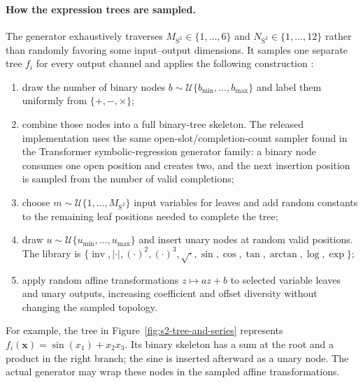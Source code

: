 \paragraph{How the expression trees are sampled.}
The generator exhaustively traverses
$M_{\mathrm{S^2}}\in\{1,\ldots,6\}$ and
$N_{\mathrm{S^2}}\in\{1,\ldots,12\}$ rather than randomly favoring some
input--output dimensions. It samples one separate tree $f_i$ for every output
channel and applies the following construction \citep{wang2025symtime}:

\begin{enumerate}
    \item draw the number of binary nodes
    $b\sim\mathcal U\{b_{\min},\ldots,b_{\max}\}$ and label them uniformly
    from $\{+,-,\times\}$;

    \item combine those nodes into a full binary-tree skeleton. The released
    implementation uses the same open-slot/completion-count sampler found in
    the Transformer symbolic-regression generator family: a binary node
    consumes one open position and creates two, and the next insertion
    position is sampled from the number of valid completions;

    \item choose $m\sim\mathcal U\{1,\ldots,M_{\mathrm{S^2}}\}$ input
    variables for leaves and add random constants to the remaining leaf
    positions needed to complete the tree;

    \item draw $u\sim\mathcal U\{u_{\min},\ldots,u_{\max}\}$ and insert unary
    nodes at random valid positions. The library is
    $\{\operatorname{inv},|\cdot|,(\cdot)^2,(\cdot)^3,\sqrt{\cdot},
    \sin,\cos,\tan,\arctan,\log,\exp\}$;

    \item apply random affine transformations $z\mapsto az+b$ to selected
    variable leaves and unary outputs, increasing coefficient and offset
    diversity without changing the sampled topology.
\end{enumerate}

For example, the tree in Figure~\ref{fig:s2-tree-and-series} represents
$f_i(\mathbf x)=\sin(x_1)+x_2x_3$. Its binary skeleton has a sum at the root
and a product in the right branch; the sine is inserted afterward as a unary
node. The actual generator may wrap these nodes in the sampled affine
transformations.


